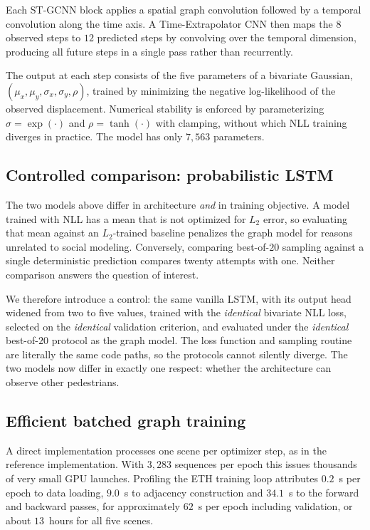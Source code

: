 \documentclass[conference]{IEEEtran}
\begin{document}
Each ST-GCNN block applies a spatial graph convolution followed by a temporal convolution
along the time axis. A Time-Extrapolator CNN then maps the $8$ observed steps to $12$
predicted steps by convolving over the temporal dimension, producing all future steps in a
single pass rather than recurrently.

The output at each step consists of the five parameters of a bivariate Gaussian,
$(\mu_x, \mu_y, \sigma_x, \sigma_y, \rho)$, trained by minimizing the negative
log-likelihood of the observed displacement. Numerical stability is enforced by
parameterizing $\sigma = \exp(\cdot)$ and $\rho = \tanh(\cdot)$ with clamping, without
which NLL training diverges in practice. The model has only $7{,}563$ parameters.

\subsection{Controlled comparison: probabilistic LSTM}

The two models above differ in architecture \emph{and} in training objective. A model
trained with NLL has a mean that is not optimized for $L_2$ error, so evaluating that mean
against an $L_2$-trained baseline penalizes the graph model for reasons unrelated to
social modeling. Conversely, comparing best-of-$20$ sampling against a single deterministic
prediction compares twenty attempts with one. Neither comparison answers the question of
interest.

We therefore introduce a control: the same vanilla LSTM, with its output head widened from
two to five values, trained with the \emph{identical} bivariate NLL loss, selected on the
\emph{identical} validation criterion, and evaluated under the \emph{identical}
best-of-$20$ protocol as the graph model. The loss function and sampling routine are
literally the same code paths, so the protocols cannot silently diverge. The two models
now differ in exactly one respect: whether the architecture can observe other pedestrians.

\subsection{Efficient batched graph training}
\label{sec:blockdiag}

A direct implementation processes one scene per optimizer step, as in the reference
implementation. With $3{,}283$ sequences per epoch this issues thousands of very small GPU
launches. Profiling the ETH training loop attributes $0.2$~s per epoch to data loading,
$9.0$~s to adjacency construction and $34.1$~s to the forward and backward passes, for
approximately $62$~s per epoch including validation, or about $13$~hours for all five scenes.
\end{document}
